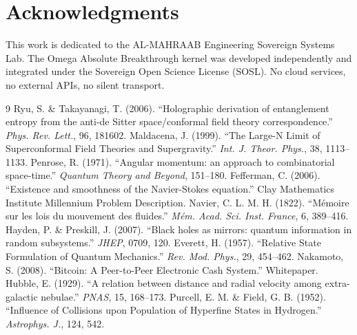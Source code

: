 \documentclass[12pt,a4paper]{article}
\theoremstyle{definition}
\begin{document}
\section*{Acknowledgments}
This work is dedicated to the AL-MAHRAAB Engineering Sovereign Systems Lab. The Omega Absolute Breakthrough kernel was developed independently and integrated under the Sovereign Open Science License (SOSL). No cloud services, no external APIs, no silent transport.

\begin{thebibliography}{9}
 Ryu, S. \& Takayanagi, T. (2006). ``Holographic derivation of entanglement entropy from the anti-de Sitter space/conformal field theory correspondence.'' \textit{Phys. Rev. Lett.}, 96, 181602.
 Maldacena, J. (1999). ``The Large-N Limit of Superconformal Field Theories and Supergravity.'' \textit{Int. J. Theor. Phys.}, 38, 1113--1133.
 Penrose, R. (1971). ``Angular momentum: an approach to combinatorial space-time.'' \textit{Quantum Theory and Beyond}, 151--180.
 Fefferman, C. (2006). ``Existence and smoothness of the Navier-Stokes equation.'' Clay Mathematics Institute Millennium Problem Description.
 Navier, C. L. M. H. (1822). ``M\'{e}moire sur les lois du mouvement des fluides.'' \textit{M\'{e}m. Acad. Sci. Inst. France}, 6, 389--416.
 Hayden, P. \& Preskill, J. (2007). ``Black holes as mirrors: quantum information in random subsystems.'' \textit{JHEP}, 0709, 120.
 Everett, H. (1957). ``Relative State Formulation of Quantum Mechanics.'' \textit{Rev. Mod. Phys.}, 29, 454--462.
 Nakamoto, S. (2008). ``Bitcoin: A Peer-to-Peer Electronic Cash System.'' Whitepaper.
 Hubble, E. (1929). ``A relation between distance and radial velocity among extra-galactic nebulae.'' \textit{PNAS}, 15, 168--173.
 Purcell, E. M. \& Field, G. B. (1952). ``Influence of Collisions upon Population of Hyperfine States in Hydrogen.'' \textit{Astrophys. J.}, 124, 542.
\end{thebibliography}
\end{document}

